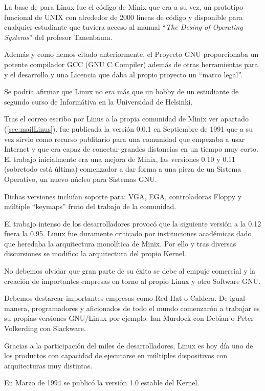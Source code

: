 La base de para Linux fue el código de Minix que era a su vez, un prototipo funcional de UNIX con alrededor de 2000 líneas 
de 
código y disponible para cualquier estudiante que tuviera acceso al manual 
``\textit{The Desing of Operating Systems}'' del profesor Tanenbaum.


Además y como hemos citado anteriormente, el Proyecto GNU proporcionaba un 
potente compilador GCC (GNU C Compiler) además de otras herramientas para y el 
desarrollo y una Licencia que daba al propio proyecto un ``marco legal''.


Se podría afirmar que Linux no era más que un hobby de un estudiante de segundo 
curso de Informátiva en la Universidad de Helsinki. 


Tras el correo escribo por Linus a la propia comunidad de Minix ver apartado 
(\ref{sec:mailLinus}). fue publicada la versión 0.0.1 en Septiembre de 1991 que 
a su vez sirvio como recurso publitario para una comunidad que empezaba a usar 
Internet y que era capaz de conectar grandes distancias en un tiempo muy corto. 
El trabajo inicialmente era una mejora de Minix, las versiones 0.10 y 0.11 
(sobretodo está última) comenzador a dar forma a una pieza de un Sistema 
Operativo, un nuevo núcleo para Sistemas GNU.


Dichas versiones incluían soporte para: VGA, EGA, controladoras Floppy y 
múltiple ``keymaps'' fruto del trabajo de la comunidad.


El trabajo intenso de los desarrolladores provocó que la siguiente versión a la 
0.12 fuera la 0.95. Linux fue duramente criticado por instituciones académicas 
dado que heredaba la arquitectura monolítica de Minix. Por ello y tras diversas 
discursiones se modifico la arquitectura del propio Kernel.


No debemos olvidar que gran parte de su éxito se debe al empuje comercial y la 
creación de importantes empresas en torno al propio Linux y otro Software GNU.


Debemos destarcar importantes empresas como Red Hat o Caldera. De igual manera, 
programadores y aficionados de todo el mundo comenzarón a trabajar es su 
propias 
versiones GNU/Linux por ejemplo: Ian Murdock con Debian o Peter Volkerding con 
Slackware.


Gracias a la participación del miles de desarrolladores, Linux es hoy día uno 
de 
los productos con capacidad de ejecutarse en múltiples dispositivos con 
arquitecturas muy distintas.


En Marzo de 1994 se publicó la versión 1.0 estable del Kernel.



